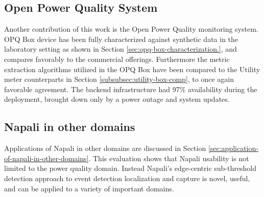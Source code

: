 \subsection{Open Power Quality System}\label{subsec:open-power-quality-system}
Another contribution of this work is the Open Power Quality monitoring system.
OPQ Box device has been fully characterized against synthetic data in the laboratory setting as shown in Section \ref{sec:opq-box-characterization.},
and compares favorably to the commercial offerings.
Furthermore the metric extraction algorithms utilized in the OPQ Box have been compared to the Utility meter counterparts in Section \ref{subsubsec:utility-box-comp}, to once again favorable agreement.
The backend infrastructure had 97\% availability during the deployment, brought down only by a power outage and system updates.

\subsection{Napali in other domains}\label{subsec:napali-in-other-domains2}
Applications of Napali in other domains are discussed in Section \ref{sec:application-of-napali-in-other-domains}.
This evaluation shows that Napali usability is not limited to the power quality domain.
Instead Napali's edge-centric sub-threshold detection approach to event detection localization and capture is novel, useful, and can be applied to a variety of important domains.